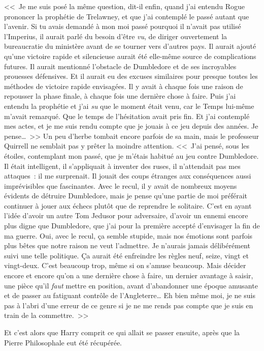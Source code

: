 <<~Je me suis posé la même question, dit-il enfin, quand j'ai entendu Rogue prononcer la prophétie de Trelawney, et que j'ai contemplé le passé autant que l'avenir. Si tu avais demandé à mon moi passé pourquoi il n'avait pas utilisé l'Imperius, il aurait parlé du besoin d'être \emph{vu}, de diriger ouvertement la bureaucratie du ministère avant de se tourner vers d'autres pays. Il aurait ajouté qu'une victoire rapide et silencieuse aurait été elle-même source de complications futures. Il aurait mentionné l'obstacle de Dumbledore et de ses incroyables prouesses défensives. Et il aurait eu des excuses similaires pour presque toutes les méthodes de victoire rapide envisagées. Il y avait à chaque fois une raison de repousser la phase finale, à chaque fois une dernière chose à faire. Puis j'ai entendu la prophétie et j'ai \emph{su} que le moment était venu, car le Temps lui-même m'avait remarqué. Que le temps de l'hésitation avait pris fin. Et j'ai contemplé mes actes, et je me suis rendu compte que je jouais à ce jeu depuis des années. Je pense…~>> Un peu d'herbe tombait encore parfois de sa main, mais le professeur Quirrell ne semblait pas y prêter la moindre attention. <<~J'ai pensé, sous les étoiles, contemplant mon passé, que je m'étais habitué au jeu contre Dumbledore. Il était intelligent, il s'appliquait à inventer des ruses, il n'attendait pas mes attaques~: il me surprenait. Il jouait des coups étranges aux conséquences aussi imprévisibles que fascinantes. Avec le recul, il y avait de nombreux moyens évidents de détruire Dumbledore, mais je pense qu'une partie de moi préférait continuer à jouer aux échecs plutôt que de reprendre le solitaire. C'est en ayant l'idée d'avoir un autre Tom Jedusor pour adversaire, d'avoir un ennemi encore plus digne que Dumbledore, que j'ai pour la première accepté d'envisager la fin de ma guerre. Oui, avec le recul, ça semble stupide, mais nos émotions sont parfois plus bêtes que notre raison ne veut l'admettre. Je n'aurais jamais délibérément suivi une telle politique. Ça aurait été enfreindre les règles neuf, seize, vingt et vingt-deux. C'est beaucoup trop, même si on s'amuse beaucoup. Mais décider encore et encore qu'on a une dernière chose à faire, un dernier avantage à saisir, une pièce qu'il \emph{faut} mettre en position, avant d'abandonner une époque amusante et de passer au fatiguant contrôle de l'Angleterre… Eh bien même moi, je ne suis pas à l'abri d'une erreur de ce genre si je ne me rends pas compte que je suis en train de la commettre.~>>

Et c'est alors que Harry comprit ce qui allait se passer ensuite, après que la Pierre Philosophale eut été récupérée.

